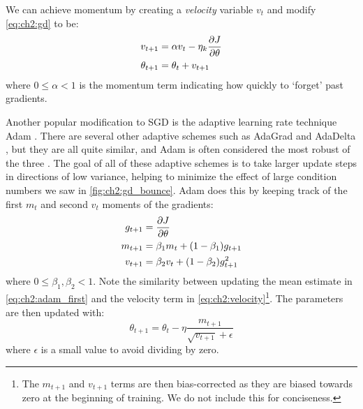 We can achieve momentum by creating a \emph{velocity} variable $v_{t}$ and modify
\eqref{eq:ch2:gd} to be:
\begin{align}
  v_{t+1} &= \alpha v_t - \eta_k\frac{\partial J}{\partial \theta} \label{eq:ch2:velocity}\\
  \theta_{t+1} &= \theta_t + v_{t+1}
\end{align}
where $0\leq\alpha<1$ is the momentum term indicating how quickly to `forget'
past gradients.

Another popular modification to SGD is the adaptive learning rate technique Adam
\cite{kingma_adam:_2014}. There are several other adaptive schemes such as
AdaGrad \cite{duchi_adaptive_2011} and AdaDelta \cite{zeiler_adadelta:_2012}, but
they are all quite similar, and Adam is often considered the most robust of the
three \cite{goodfellow_deep_2016}. The goal of all of these adaptive schemes is
to take larger update steps in directions of low variance, helping to minimize
the effect of large condition numbers we saw in \autoref{fig:ch2:gd_bounce}.
Adam does this by keeping track of the first $m_t$ and second $v_t$ moments of the
gradients:
\begin{align}
  g_{t+1} &= \frac{\partial J}{\partial \theta} \\
  m_{t+1} &= \beta_1 m_{t} + (1-\beta_1)g_{t+1} \label{eq:ch2:adam_first}\\
  v_{t+1} &= \beta_2 v_{t} + (1-\beta_2)g_{t+1}^2
\end{align}
where $0 \leq \beta_1, \beta_2 < 1$. Note the similarity between updating the
mean estimate in \eqref{eq:ch2:adam_first} and the velocity term in
\eqref{eq:ch2:velocity}\footnote{The $m_{t+1}$ and $v_{t+1}$ terms are then
bias-corrected as they are biased towards zero at the beginning of training. We
do not include this for conciseness.}. The parameters are then updated with:
\begin{equation}
  \theta_{t+1} = \theta_t - \eta \frac{m_{t+1}}{\sqrt{v_{t+1}} + \epsilon}
\end{equation}
where $\epsilon$ is a small value to avoid dividing by zero.
